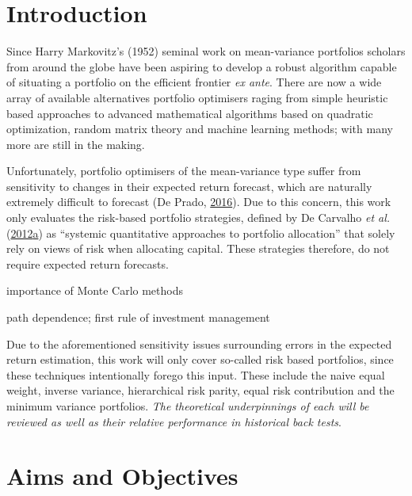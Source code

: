 \documentclass[11pt,preprint, authoryear]{elsarticle}
\numberwithin{equation}{section}
\numberwithin{figure}{section}
\numberwithin{table}{section}
\begin{document}

\headsep 35pt %




\hypertarget{introduction}{%
\section{\texorpdfstring{Introduction
\label{Introduction}}{Introduction }}\label{introduction}}

Since Harry Markovitz's (1952) seminal work on mean-variance portfolios
scholars from around the globe have been aspiring to develop a robust
algorithm capable of situating a portfolio on the efficient frontier
\emph{ex ante}. There are now a wide array of available alternatives
portfolio optimisers raging from simple heuristic based approaches to
advanced mathematical algorithms based on quadratic optimization, random
matrix theory and machine learning methods; with many more are still in
the making.

Unfortunately, portfolio optimisers of the mean-variance type suffer
from sensitivity to changes in their expected return forecast, which are
naturally extremely difficult to forecast (De Prado,
\protect\hyperlink{ref-lopez}{2016}). Due to this concern, this work
only evaluates the risk-based portfolio strategies, defined by De
Carvalho \emph{et al.}
(\protect\hyperlink{ref-leote}{2012}\protect\hyperlink{ref-leote}{a}) as
``systemic quantitative approaches to portfolio allocation'' that solely
rely on views of risk when allocating capital. These strategies
therefore, do not require expected return forecasts.

importance of Monte Carlo methods

path dependence; first rule of investment management

Due to the aforementioned sensitivity issues surrounding errors in the
expected return estimation, this work will only cover so-called risk
based portfolios, since these techniques intentionally forego this
input. These include the naive equal weight, inverse variance,
hierarchical risk parity, equal risk contribution and the minimum
variance portfolios. \emph{The theoretical underpinnings of each will be
reviewed as well as their relative performance in historical back
tests}.

\hypertarget{aims-and-objectives}{%
\section{Aims and Objectives}\label{aims-and-objectives}}
\end{document}
